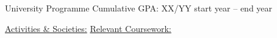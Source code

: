 \begin{cveducation}
{University}
{Programme}
{Cumulative GPA: XX/YY}
{start year -- end year}

\listitem \underline{Activities \& Societies:} \lipsum[66]
\listitem \underline{Relevant Coursework:} \lipsum[66]

\end{cveducation}
